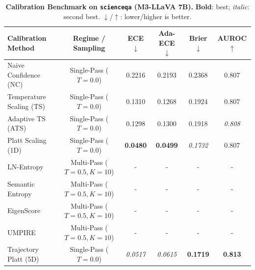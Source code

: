 \begin{table}[t]
\setlength{\tabcolsep}{4pt}
\renewcommand{\arraystretch}{1.05}
\centering
\footnotesize
\begin{tabular}{lccccc}
\toprule
\textbf{Calibration Method} & \textbf{Regime / Sampling} & \textbf{ECE} $\downarrow$ & \textbf{Ada-ECE} $\downarrow$ & \textbf{Brier} $\downarrow$ & \textbf{AUROC} $\uparrow$ \\
\midrule
Naive Confidence (NC) & Single-Pass ($T = 0.0$) & 0.2216 & 0.2193 & 0.2368 & 0.807 \\
Temperature Scaling (TS) & Single-Pass ($T = 0.0$) & 0.1310 & 0.1268 & 0.1924 & 0.807 \\
Adaptive TS (ATS) & Single-Pass ($T = 0.0$) & 0.1298 & 0.1300 & 0.1918 & \textit{0.808} \\
Platt Scaling (1D) & Single-Pass ($T = 0.0$) & \textbf{0.0480} & \textbf{0.0499} & \textit{0.1732} & 0.807 \\
LN-Entropy & Multi-Pass ($T = 0.5, K = 10$) & - & - & - & - \\
Semantic Entropy & Multi-Pass ($T = 0.5, K = 10$) & - & - & - & - \\
EigenScore & Multi-Pass ($T = 0.5, K = 10$) & - & - & - & - \\
UMPIRE & Multi-Pass ($T = 0.5, K = 10$) & - & - & - & - \\
Trajectory Platt (5D) & Single-Pass ($T = 0.0$) & \textit{0.0517} & \textit{0.0615} & \textbf{0.1719} & \textbf{0.813} \\
\bottomrule
\end{tabular}
\caption{\textbf{Calibration Benchmark on \texttt{scienceqa} (M3-LLaVA 7B).} \textbf{Bold}: best; \textit{italic}: second best. $\downarrow$/$\uparrow$: lower/higher is better.}
\label{tab:benchmark_m3_scienceqa}
\end{table}

